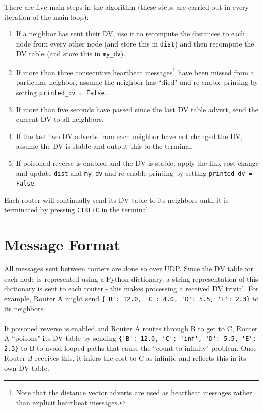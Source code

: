 \documentclass[12pt,a4paper]{article}
\begin{document}
There are five main steps in the algorithm (these steps are carried out in every iteration of the main loop):
\begin{enumerate}
	\item If a neighbor has sent their DV, use it to recompute the distances to each node from every other node (and store this in \verb|dist|) and then recompute the DV table (and store this in \verb|my_dv|).
	\item If more than three consecutive heartbeat messages\footnote{Note that the distance vector adverts are used as heartbeat messages rather than explicit heartbeat messages.} have been missed from a particular neighbor, assume the neighbor has ``died" and re-enable printing by setting \verb|printed_dv = False|.
	\item If more than five seconds have passed since the last DV table advert, send the current DV to all neighbors.
	\item If the last two DV adverts from each neighbor have not changed the DV, assume the DV is stable and output this to the terminal.
	\item If poisoned reverse is enabled and the DV is stable, apply the link cost change and update \verb|dist| and \verb|my_dv| and re-enable printing by setting \verb|printed_dv = False|.
\end{enumerate}
Each router will continually send its DV table to its neighbors until it is terminated by pressing \verb|CTRL+C| in the terminal.

\section{Message Format}
\label{sec:msg_format}

All messages sent between routers are done so over UDP. Since the DV table for each node is represented using a Python dictionary, a string representation of this dictionary is sent to each router - this makes processing a received DV trivial. For example, Router A might send \verb|{'B': 12.0, 'C': 4.0, 'D': 5.5, 'E': 2.3}| to its neighbors.
\\\\
If poisoned reverse is enabled and Router A routes through B to get to C, Router A ``poisons" its DV table by sending \verb|{'B': 12.0, 'C': 'inf', 'D': 5.5, 'E': 2.3}| to B to avoid looped paths that cause the ``count to infinity" problem. Once Router B receives this, it infers the cost to C as infinite and reflects this in its own DV table.
\end{document}
